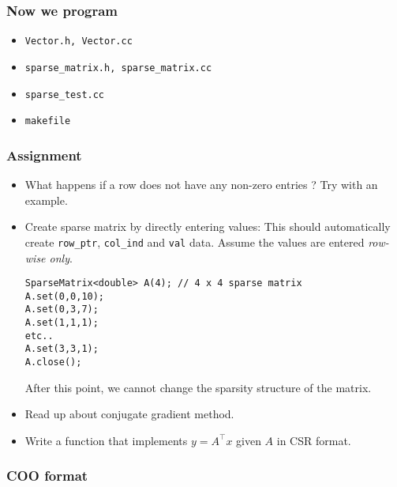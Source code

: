 \documentclass[10pt,xcolor=svgnames]{beamer}
\begin{document}
\begin{frame}
\frametitle{Now we program}

\begin{itemize}
\item {\tt Vector.h, Vector.cc}
\item {\tt sparse\_matrix.h, sparse\_matrix.cc}
\item {\tt sparse\_test.cc}
\item {\tt makefile}
\end{itemize}

\end{frame}
\begin{frame}[fragile]
\frametitle{Assignment}

\begin{itemize}

\item What happens if a row does not have any non-zero entries ? Try with an example.

\item Create sparse matrix by directly entering values: This should automatically create {\tt row\_ptr}, {\tt col\_ind} and {\tt val} data. Assume the values are entered {\em row-wise only}.
\begin{lstlisting}
SparseMatrix<double> A(4); // 4 x 4 sparse matrix
A.set(0,0,10);
A.set(0,3,7);
A.set(1,1,1);
etc..
A.set(3,3,1);
A.close();
\end{lstlisting}
After this point, we cannot change the sparsity structure of the matrix.
\item Read up about conjugate gradient method.

\item Write a function that implements $y = A^\top x$ given $A$ in CSR format.
\end{itemize}

\end{frame}
\begin{frame}[fragile]
\frametitle{COO format}

\end{frame}
\end{document}
